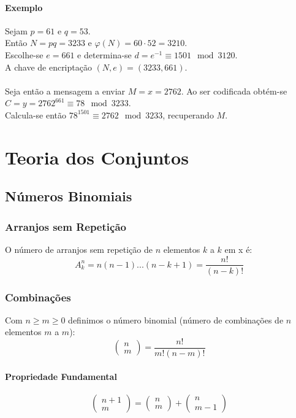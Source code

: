 \documentclass[10pt,a4paper]{report}
\begin{document}
\subsubsection{Exemplo}
Sejam $p = 61$ e $q = 53$.\\
Então $N = pq = 3233$ e $\varphi(N) = 60 \cdot 52 = 3210$.\\
Escolhe-se $e = 661$ e determina-se $d = e^{-1} \equiv 1501 \mod 3120$.\\
A chave de encriptação $(N,e) =  (3233,661)$.\\
\\
Seja então a mensagem a enviar $M = x = 2762$. Ao ser codificada obtém-se $C = y = 2762^{661} \equiv 78 \mod 3233$.\\
Calcula-se então $78^{1501} \equiv 2762 \mod 3233$, recuperando $M$.

\chapter{Teoria dos Conjuntos}
\section{Números Binomiais}
\subsection{Arranjos sem Repetição}
O número de arranjos sem repetição de $n$ elementos $k$ a $k$ em x é:
$$
A_k^n = n(n-1) ... (n-k+1) = \frac{n!}{(n-k)!}
$$
\subsection{Combinações}
Com $n \geq m \geq 0$ definimos o número binomial (número de combinações de $n$ elementos $m$ a $m$):
$$
\begin{pmatrix}
n\\
m
\end{pmatrix} = \frac{n!}{m!(n-m)!}
$$
\subsubsection{Propriedade Fundamental}
$$
\begin{pmatrix}
n+1\\
m
\end{pmatrix} = \begin{pmatrix}
n\\
m
\end{pmatrix} + \begin{pmatrix}
n\\
m-1
\end{pmatrix}
$$
\end{document}
